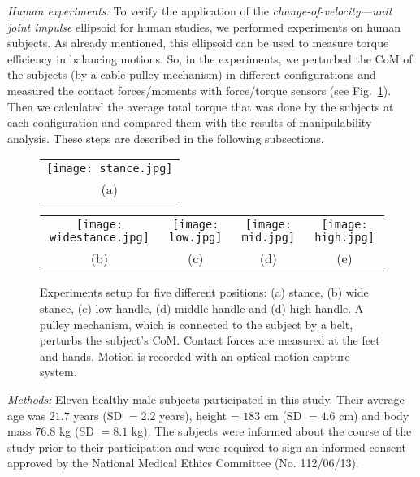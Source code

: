 \textit{Human experiments:} To verify the application of the \textit{change-of-velocity---unit joint 	impulse} ellipsoid for human studies, we performed experiments on human subjects. As already mentioned, this ellipsoid can be used to measure torque efficiency in balancing motions. So, in the experiments, we perturbed the CoM of the subjects (by a cable-pulley mechanism) in different configurations and measured the contact forces/moments with force/torque sensors (see Fig.~\ref{experimentsetup}). Then we calculated the average total torque that was done by the subjects at each configuration and compared them with the results of manipulability analysis. These steps are described in the following subsections.

\begin{figure}
	\centering
	\begin{tabular}{c}
		\texttt{[image: stance.jpg]} \\
		(a)\\
		
	\end{tabular}
	\centering
	\begin{tabular}{cccc}
		\texttt{[image: widestance.jpg]} &
		\texttt{[image: low.jpg]} &
		\texttt{[image: mid.jpg]} &
		\texttt{[image: high.jpg]} \\
		(b) & (c) & (d) & (e)
	\end{tabular}
	\caption{Experiments setup for five different positions: (a) stance, (b) wide stance, (c) low handle, (d) middle handle and (d) high handle. A pulley mechanism, which is connected to the subject by a belt, perturbs the subject's CoM. Contact forces are measured at the feet and hands. Motion is recorded with an optical motion capture system.}
	\label{experimentsetup}
\end{figure}


\textit{Methods:} Eleven healthy male subjects participated in this study. Their average age was $21.7$ years (SD $=2.2$ years), height = $183$ cm (SD $=4.6$ cm) and body mass $76.8$ kg (SD $=8.1$ kg). The subjects were informed about the course of the study prior to their participation and were required to sign an informed consent approved by the National Medical Ethics Committee (No. 112/06/13).

